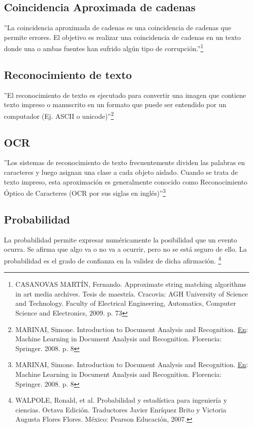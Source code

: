 \subsection{Coincidencia Aproximada de cadenas}  
''La coincidencia aproximada de cadenas es una coincidencia de cadenas 
que permite errores. El objetivo es realizar una coincidencia de 
cadenas en un texto donde una o ambas fuentes han sufrido alg\'un tipo 
de corrupci\'on.''\footnote{CASANOVAS MART\'IN, Fernando. Approximate string matching algorithms in art media archives.
Tesis de maestr\'ia. Cracovia:  AGH University of Science and Technology.
Faculty of Electrical Engineering, Automatics, Computer Science and Electronics, 2009. p. 73}

\subsection{Reconocimiento de texto} 
''El reconocimiento de texto es ejecutado para convertir una imagen 
que contiene texto impreso o manuscrito en un formato que puede ser 
entendido por un computador (Ej. ASCII o unicode)''\footnote{MARINAI, Simone. Introduction to Document Analysis and Recognition. 
\underline{En}: Machine Learning in Document Analysis and Recognition. Florencia: Springer. 2008. p. 8}

\subsection{OCR}
''Los sistemas de reconocimiento de texto frecuentemente dividen las 
palabras en caracteres y luego asignan una clase a cada objeto aislado.
Cuando se trata de texto impreso, esta aproximaci\'on es generalmente 
conocido como Reconocimiento \'Optico de Caracteres (OCR por sus siglas 
en ingl\'es)''\footnote{MARINAI, Simone. Introduction to Document Analysis and Recognition. 
\underline{En}: Machine Learning in Document Analysis and Recognition. Florencia: Springer. 2008. p. 8}


\subsection{Probabilidad}
La probabilidad permite expresar num\'ericamente la posibilidad que un 
evento ocurra.  Se afirma que algo va o no va a ocurrir, pero no se 
est\'a seguro de ello. La probabilidad es el grado de confianza en la 
validez de dicha afirmaci\'on. \footnote{ WALPOLE, Ronald, et al. Probabilidad y estad\'istica para ingenier\'ia y ciencias. Octava Edici\'on. Traductores Javier Enr\'iquez Brito y Victoria Augusta Flores Flores. M\'exico: Pearson Educaci\'on,  2007.}

\pagebreak
